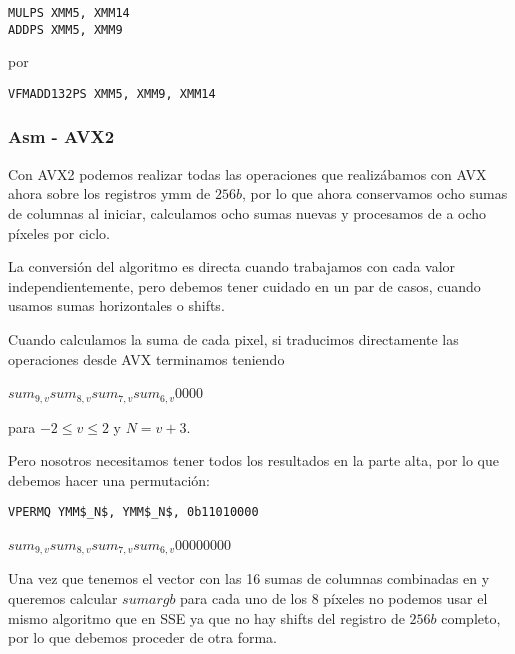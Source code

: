 \begin{lstlisting}
MULPS XMM5, XMM14
ADDPS XMM5, XMM9
\end{lstlisting}

por

\begin{lstlisting}
VFMADD132PS XMM5, XMM9, XMM14
\end{lstlisting}

\subsubsection{Asm - AVX2}

Con AVX2 podemos realizar todas las operaciones que realizábamos con AVX ahora sobre los registros ymm de $256b$, por lo que ahora conservamos ocho sumas de columnas al iniciar, calculamos ocho sumas nuevas y procesamos de a ocho píxeles por ciclo.

La conversión del algoritmo es directa cuando trabajamos con cada valor independientemente, pero debemos tener cuidado en un par de casos, cuando usamos sumas horizontales o shifts.

\vspace{5mm}

Cuando calculamos la suma de cada pixel, si traducimos directamente las operaciones desde AVX terminamos teniendo

 
{$sum_{9,v}$}{$sum_{8,v}$}{$sum_{7,v}$}{$sum_{6,v}$}{0}{0}{0}{0}

para $-2 \le v \le 2$ y $N = v+3$.

Pero nosotros necesitamos tener todos los resultados en la parte alta, por lo que debemos hacer una permutación:

\begin{lstlisting}
VPERMQ YMM$_N$, YMM$_N$, 0b11010000
\end{lstlisting}

 
{$sum_{9,v}$}{$sum_{8,v}$}{$sum_{7,v}$}{$sum_{6,v}$}{0}{0}{0}{0}{0}{0}{0}{0}

\vspace{5mm}

Una vez que tenemos el vector con las 16 sumas de columnas combinadas en  y queremos calcular $sumargb$ para cada uno de los 8 píxeles no podemos usar el mismo algoritmo que en SSE ya que no hay shifts del registro de $256b$ completo, por lo que debemos proceder de otra forma.

